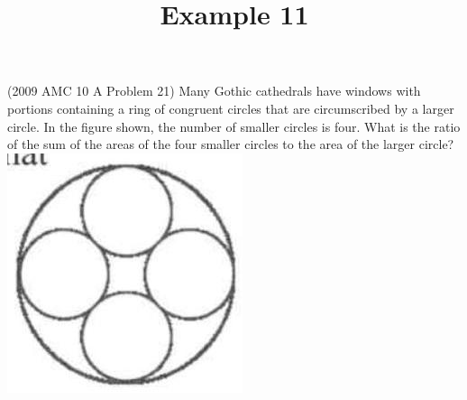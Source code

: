 \documentclass{article}
\title{Example 11}
\date{}
\begin{document}
\maketitle

(2009 AMC 10 A Problem 21) Many Gothic cathedrals have windows with portions containing a ring of congruent circles that are circumscribed by a larger circle. In the figure shown, the number of smaller circles is four. What is the ratio of the sum of the areas of the four smaller circles to the area of the larger circle?\\
\centering
\includegraphics[width=\textwidth]{images/problem_image_1.jpg}
\end{document}
